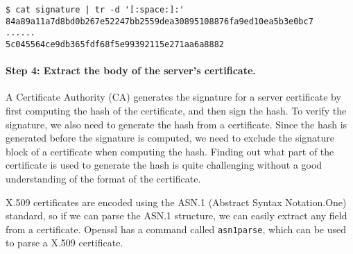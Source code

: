 \begin{lstlisting}
$ cat signature | tr -d '[:space:]:'
84a89a11a7d8bd0b267e52247bb2559dea30895108876fa9ed10ea5b3e0bc7
......
5c045564ce9db365fdf68f5e99392115e271aa6a8882
\end{lstlisting}
 


\begin{comment}
\begin{lstlisting}
$ openssl x509 -in Chase.crt -text -noout -certopt ca_default 
               -certopt no_validity -certopt no_serial 
	       -certopt no_subject -certopt no_extensions 
	       -certopt no_signame | grep -v 'Signature Algorithm' 
	                           | tr -d '[:space:]:'
\end{lstlisting}
\end{comment}



\paragraph{Step 4: Extract the body of the server's certificate.}
A Certificate Authority (CA) generates the signature for a server certificate by first 
computing the hash of the certificate, and then sign the hash. To
verify the signature, we also need to generate the hash from a 
certificate. Since the hash is generated before the signature is computed, 
we need to exclude the signature block of a certificate when computing the 
hash. Finding out what part of the certificate is used to 
generate the hash is quite challenging without a good understanding 
of the format of the certificate. 




X.509 certificates are encoded using the ASN.1 (Abstract Syntax Notation.One) standard, 
so if we can parse the ASN.1 structure, we can easily extract any field from a certificate. 
Openssl has a command called \texttt{asn1parse}, which can be used 
to parse a X.509 certificate. 



